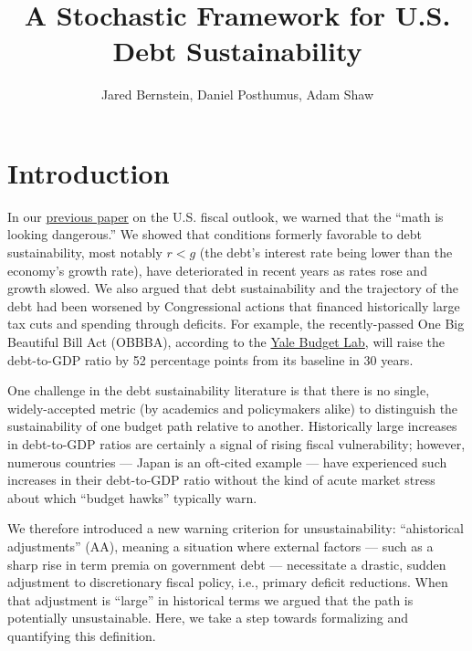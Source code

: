 \documentclass[12pt]{article}
\title{A Stochastic Framework for U.S. Debt Sustainability}
\author{Jared Bernstein, Daniel Posthumus, Adam Shaw}
\begin{document}
\maketitle

\section{Introduction}

In our \href{https://siepr.stanford.edu/publications/policy-brief/us-budget-math-looking-dangerous}{previous paper} on the U.S. fiscal outlook, we warned that the ``math is looking dangerous.'' We showed that conditions formerly favorable to debt sustainability, most notably $r < g$ (the debt's interest rate being lower than the economy's growth rate), have deteriorated in recent years as rates rose and growth slowed. We also argued that debt sustainability and the trajectory of the debt had been worsened by Congressional actions that financed historically large tax cuts and spending through deficits. For example, the recently-passed One Big Beautiful Bill Act (OBBBA), according to the \href{https://budgetlab.yale.edu/research/long-term-impacts-one-big-beautiful-bill-act-enacted-july-4-2025}{Yale Budget Lab}, will raise the debt-to-GDP ratio by 52 percentage points from its baseline in 30 years.

One challenge in the debt sustainability literature is that there is no single, widely-accepted metric (by academics and policymakers alike) to distinguish the sustainability of one budget path relative to another. Historically large increases in debt-to-GDP ratios are certainly a signal of rising fiscal vulnerability; however, numerous countries --- Japan is an oft-cited example --- have experienced such increases in their debt-to-GDP ratio without the kind of acute market stress about which ``budget hawks'' typically warn. 

We therefore introduced a new warning criterion for unsustainability: ``ahistorical adjustments'' (AA), meaning a situation where external factors --- such as a sharp rise in term premia on government debt --- necessitate a drastic, sudden adjustment to discretionary fiscal policy, i.e., primary deficit reductions. When that adjustment is ``large'' in historical terms we argued that the path is potentially unsustainable. Here, we take a step towards formalizing and quantifying this definition.
\end{document}
